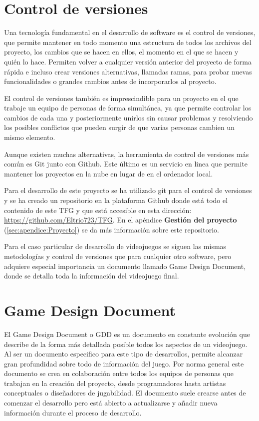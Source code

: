 \section{Control de versiones}

Una tecnología fundamental en el desarrollo de software es el control de versiones, que permite mantener en todo momento una estructura de todos los archivos del proyecto, los cambios que se hacen en ellos, el momento en el que se hacen y quién lo hace. Permiten volver a cualquier versión anterior del proyecto de forma rápida e incluso crear versiones alternativas, llamadas ramas, para probar nuevas funcionalidades o grandes cambios antes de incorporarlos al proyecto. 

El control de versiones también es imprescindible para un proyecto en el que trabaje un equipo de personas de forma simultánea, ya que permite controlar los cambios de cada una y posteriormente unirlos sin causar problemas y resolviendo los posibles conflictos que pueden surgir de que varias personas cambien un mismo elemento.

Aunque existen muchas alternativas, la herramienta de control de versiones más común es Git junto con Github. Este último es un servicio en linea que permite mantener los proyectos en la nube en lugar de en el ordenador local.

Para el desarrollo de este proyecto se ha utilizado git para el control de versiones y se ha creado un repositorio en la plataforma Github donde está todo el contenido de este TFG y que está accesible en esta dirección: \url{https://github.com/Eltrio723/TFG}. En el apéndice \textbf{Gestión del proyecto} (\ref{sec:apendice:Proyecto}) se da más información sobre este repositorio.

Para el caso particular de desarrollo de videojuegos se siguen las mismas metodologías y control de versiones que para cualquier otro software, pero adquiere especial importancia un documento llamado Game Design Document, donde se detalla toda la información del videojuego final.

\section{Game Design Document}

El Game Design Document o GDD es un documento en constante evolución que describe de la forma más detallada posible todos los aspectos de un videojuego. Al ser un documento especifico para este tipo de desarrollos, permite alcanzar gran profundidad sobre todo de información del juego.  Por norma general este documento se crea en colaboración entre todos los equipos de personas que trabajan en la creación del proyecto, desde programadores hasta artistas conceptuales o diseñadores de jugabilidad. El documento suele crearse antes de comenzar el desarrollo pero está abierto a actualizarse y añadir nueva información durante el proceso de desarrollo.

